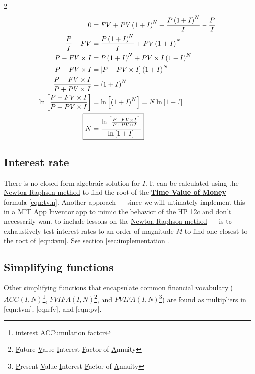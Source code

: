 \documentclass[11pt]{article}%
\begin{document}
\begin{multicols*}{2}
\begin{align}
0 &= FV + PV \left( 1 + I \right)^{N} + \frac{P \left( 1 + I \right)^{N}}{I} - \frac{P}{I} \\
\frac{P}{I} - FV &= \frac{P \left( 1 + I \right)^{N}}{I} + PV \left( 1 + I \right)^{N} \\
P - FV \times I &= P \left( 1 + I \right)^{N} + PV \times I \left( 1 + I \right)^{N} \\
P - FV \times I &= \left[ P + PV \times I \right ] \left( 1 + I \right)^{N} \\
\frac{P - FV \times I}{P + PV \times I} &= \left( 1 + I \right)^{N} \\
\ln\left[ \frac{P - FV \times I}{P + PV \times I} \right] &= \ln\left[ \left( 1 + I \right)^{N} \right] = N \ln\left[ 1 + I \right] \\
\Aboxed{N &= \frac{\ln\left[ \frac{P - FV \times I}{P + PV \times I} \right]}{\ln\left[ 1 + I \right]}} \label{eqn:nper}
\end{align}

\subsection{Interest rate}\label{sec:int}

There is no closed-form algebraic solution for $I$. It can be calculated using the \href{https://en.wikipedia.org/wiki/Newton's_method}{Newton-Raphson method} to find the root of the \textbf{\href{https://en.wikipedia.org/wiki/Time_value_of_money}{Time Value of Money}} formula \eqref{eqn:tvm}. Another approach --- since we will ultimately implement this in a \href{https://appinventor.mit.edu/}{MIT App Inventor} app to mimic the behavior of the \href{https://h10032.www1.hp.com/ctg/Manual/c00363319.pdf}{HP 12c} and don't necessarily want to include lessons on the \href{https://en.wikipedia.org/wiki/Newton's_method}{Newton-Raphson method} --- is to exhaustively test interest rates to an order of magnitude $M$ to find one closest to the root of \eqref{eqn:tvm}. See section \ref{sec:implementation}.

\subsection{Simplifying functions}\label{sec:simplifying}

Other simplifying functions that encapsulate common financial vocabulary ($ACC(I, N)$\footnote{interest \underline{ACC}umulation factor}, $FVIFA(I, N)$\footnote{\underline{F}uture \underline{V}alue \underline{I}nterest \underline{F}actor of \underline{A}nnuity}, and $PVIFA(I, N)$\footnote{\underline{P}resent \underline{V}alue \underline{I}nterest \underline{F}actor of \underline{A}nnuity}) are found as multipliers in \eqref{eqn:tvm}, \eqref{eqn:fv}, and \eqref{eqn:pv}.


\end{multicols*}
\end{document}
